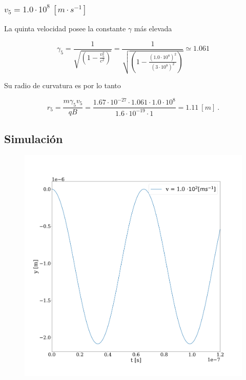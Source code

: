 \documentclass[journal]{IEEEtran}
\begin{document}
\subsubsection{$v_5 = 1.0\cdot 10^8~[m\cdot s^{-1}]$}

La quinta velocidad posee la constante $\gamma$ más elevada

\begin{equation}
\gamma_5 = \displaystyle\frac{1}{\sqrt{(1-\displaystyle\frac{v_5^2}{c^2})}} = \displaystyle\frac{1}{\sqrt{(1-\displaystyle\frac{(1.0\cdot 10^8)^2}{(3\cdot 10^8)^2})}} \simeq 1.061
\end{equation}

Su radio de curvatura es por lo tanto

\begin{equation}
r_5 = \displaystyle\frac{m\gamma_5v_5}{qB} = \displaystyle\frac{1.67\cdot 10^{-27}\cdot 1.061 \cdot 1.0\cdot 10^8}{1.6\cdot 10^{-19}\cdot 1} = 1.11 ~[m]~.
\end{equation}

\subsection{Simulación}

\begin{figure}
    \centering
    \includegraphics[width=\linewidth]{freq_rel_1.png}
\end{figure}
\end{document}
